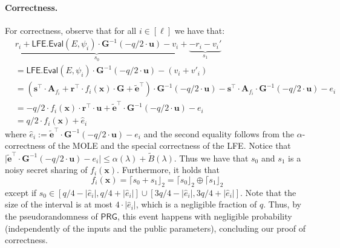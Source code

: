 \documentclass{article}
\newcommand{\LFE}{\mathsf{LFE}}
\renewcommand{\sec}{\ensuremath{\lambda}}
\newcommand{\algofont}[1]{\ensuremath{\mathsf{#1}}}
\newcommand{\Eval}{\algofont{Eval}\xspace}
\begin{document}
\paragraph{Correctness.}
For correctness, observe that for all $i\in[\ell]$ we have that:
\begin{align*}
    &\underbrace{r_i + \LFE.\Eval(E, \psi_i)\cdot  \mathbf{G}^{-1}(-q/2\cdot \mathbf{u}) - v_i}_{s_0} +
    \underbrace{- r_i -v_i'}_{s_1}\\
    &=\LFE.\Eval(E, \psi_i)\cdot  \mathbf{G}^{-1}(-q/2\cdot \mathbf{u}) -(v_i +v'_i)\\
    &=(\mathbf{s}^\intercal\cdot \mathbf{A}_{f_i}+ \mathbf{r}^\intercal\cdot f_i(\mathbf{x})\cdot \mathbf{G}+\mathbf{\widetilde{e}}^\intercal)\cdot  \mathbf{G}^{-1}(-q/2\cdot \mathbf{u}) - \mathbf{s}^\intercal\cdot \mathbf{A}_{f_i}\cdot \mathbf{G}^{-1}(-q/2\cdot \mathbf{u})-e_i\\  
    &= -q/2\cdot f_i(\mathbf{x})\cdot \mathbf{r}^\intercal\cdot\mathbf{u}+ \widetilde{\mathbf{e}}^\intercal\cdot  \mathbf{G}^{-1}(-q/2\cdot \mathbf{u})-e_i\\
    &= q/2\cdot f_i(\mathbf{x}) +\hat{e}_i
\end{align*}
where $\hat{e}_i:=\widetilde{\mathbf{e}}^\intercal\cdot  \mathbf{G}^{-1}(-q/2\cdot \mathbf{u})-e_i$ and the second equality follows from the $\alpha$-correctness of the MOLE and the special correctness of the LFE. Notice that $\lvert \widetilde{\mathbf{e}}^\intercal\cdot  \mathbf{G}^{-1}(-q/2\cdot \mathbf{u})-e_i\rvert\le \alpha(\sec)+\widetilde{B}(\sec)$. Thus we have that $s_0$ and $s_1$ is a noisy secret sharing of $f_i(\mathbf{x})$. Furthermore, it holds that
\[
f_i(\mathbf{x}) = \lceil s_0 + s_1\rfloor_2
= \lceil s_0\rfloor_2 \oplus \lceil s_1\rfloor_2
\]
except if $s_0 \in [q/4 -  \lvert\hat{e}_i\rvert, q/4 + \lvert\hat{e}_i\rvert] \cup [3q/4 - \lvert\hat{e}_i\rvert, 3q/4 + \lvert\hat{e}_i\rvert]$. Note that the size of the interval is at most $ 4\cdot\lvert\hat{e}_i\rvert$, which is a negligible fraction of $q$. Thus, by the pseudorandomness of $\mathsf{PRG}$, this event happens with negligible probability {(independently of the inputs and the public parameters),} concluding our proof of correctness.
\end{document}
